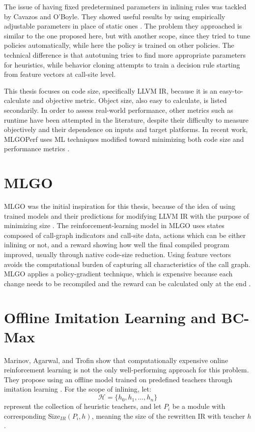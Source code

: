 \documentclass[12pt, a4paper]{report}
\begin{document}
The issue of having fixed predetermined parameters in inlining rules was
tackled by Cavazos and O'Boyle. They showed useful results by using empirically
adjustable parameters in place of static ones \cite{cavazos2005automatic}. The
problem they approached is similar to the one proposed here, but with another
scope, since they tried to tune policies automatically, while here the policy is
trained on other policies. The technical difference is that autotuning tries to
find more appropriate parameters for heuristics, while behavior cloning attempts
to train a decision rule starting from feature vectors at call-site level.

This thesis focuses on code size, specifically LLVM IR, because it is an
easy-to-calculate and objective metric. Object size, also easy to
calculate, is listed secondarily. In order to assess real-world
performance, other metrics such as runtime have been attempted in the
literature, despite their difficulty to measure objectively and their dependence
on inputs and target platforms. In recent work, MLGOPerf uses ML techniques
modified toward minimizing both code size and performance metrics
\cite{mlgoperf}.

\section{MLGO}

MLGO was the initial inspiration for this thesis, because of the idea of using
trained models and their predictions for modifying LLVM IR with the purpose of
minimizing size \cite{mlgo,llvmmlgo}. The reinforcement-learning model in MLGO
uses states composed of call-graph indicators and call-site data, actions which
can be either inlining or not, and a reward showing how well the final compiled
program improved, usually through native code-size reduction. Using feature
vectors avoids the computational burden of capturing all characteristics of the
call graph. MLGO applies a policy-gradient technique, which is expensive because
each change needs to be recompiled and the reward can be calculated only at the
end \cite{mlgo}.

\section{Offline Imitation Learning and BC-Max}

Marinov, Agarwal, and Trofin show that computationally expensive online
reinforcement learning is not the only well-performing approach for this
problem. They propose using an offline model trained on predefined teachers
through imitation learning
\cite{bcmax}. For the scope of inlining, let:
\[
  \mathcal{H} = \{h_0, h_1, \ldots, h_n\}
\]
represent the collection of heuristic teachers, and let \(P_i\) be a module
with corresponding \(\mathrm{Size}_{IR}(P_i, h)\), meaning the size of the
rewritten IR with teacher \(h\).
\end{document}
